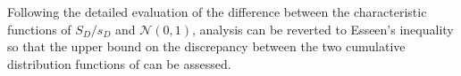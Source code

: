 Following the detailed evaluation of the difference between the characteristic functions of $S_D/s_D$ and $\mathcal{N}(0,1)$, analysis can be reverted to Esseen's inequality so that the upper bound on the discrepancy between the two cumulative distribution functions of can be assessed. 

